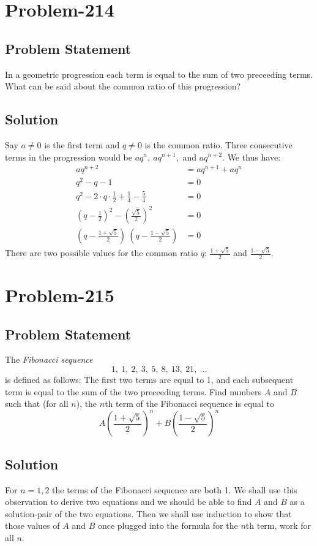 \documentclass[12pt]{article}
\begin{document}
\section*{Problem-214}
\subsection*{Problem Statement}
In a geometric progression each term is equal to the sum of two preceeding terms. What can be said about the common ratio of this progression?

\subsection*{Solution}
Say $a \neq 0$ is the first term and $q \neq 0$ is the common ratio. Three consecutive terms in the progression would be $aq^n,\ aq^{n+1},$ and $aq^{n+2}$. We thus have:
\begin{equation*}
	\begin{aligned}
		aq^{n+2} &= aq^{n+1} + aq^{n}\\
		q^2 - q - 1 &= 0\\
		q^2 - 2 \cdot q \cdot \frac{1}{2} + \frac{1}{4} - \frac{5}{4} &= 0\\
		\left(q - \frac{1}{2}\right)^2 - \left( \frac{\sqrt{5}}{2} \right)^2 &= 0\\
		\left( q - \frac{1+\sqrt{5}}{2} \right)\ \left( q - \frac{1-\sqrt{5}}{2} \right) &= 0
	\end{aligned}
\end{equation*}
There are two possible values for the common ratio $q$: $\frac{1+\sqrt{5}}{2}$ and $\frac{1-\sqrt{5}}{2}$.

\section*{Problem-215}
\subsection*{Problem Statement}
The \emph{Fibonacci sequence}
\[
	1,\ 1,\ 2,\ 3,\ 5,\ 8,\ 13,\ 21,\ \ldots
\]
is defined as follows: The first two terms are equal to 1, and each subsequent term is equal to the sum of the two preceeding terms. Find numbers $A$ and $B$ such that (for all $n$), the $n$th term of the Fibonacci sequence is equal to
\[
	A \left( \frac{1+\sqrt{5}}{2} \right)^n + B \left( \frac{1-\sqrt{5}}{2} \right)^n
\]

\subsection*{Solution}
For $n=1,2$ the terms of the Fibonacci sequence are both 1. We shall use this observation to derive two equations and we should be able to find $A$ and $B$ as a solution-pair of the two equations. Then we shall use induction to show that those values of $A$ and $B$ once plugged into the formula for the $n$th term, work for all $n$.
\end{document}
